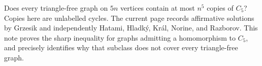 Does every triangle-free graph on $5n$ vertices contain at most $n^5$ copies of $C_5$? Copies here are unlabelled cycles. The current page records affirmative solutions by Grzesik and independently Hatami, Hladk\'y, Kr\'al, Norine, and Razborov. This note proves the sharp inequality for graphs admitting a homomorphism to $C_5$, and precisely identifies why that subclass does not cover every triangle-free graph.
